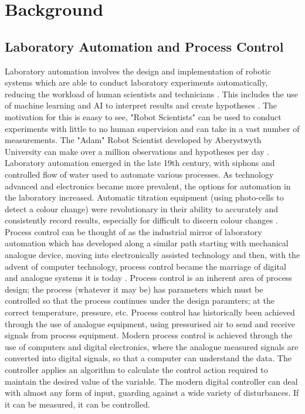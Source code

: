 \documentclass[twoside,a4]{report}
\def\shorttitle{Development of a Rheometer Controller}
\def\br{\newline \newline \noindent}
\def\achapter{\shorttitle}  %
\def\nc#1{
	\addtocounter{chapter}{1} 
	\def\achapter{\arabic{chapter} #1}
	\addcontentsline{toc}{chapter}{\achapter} 
	\chapter*{\arabic{chapter} #1} 
}
\begin{document}


	\nc{Background} %
	\section{Laboratory Automation and Process Control}
	Laboratory automation involves the design and implementation of robotic systems which are able to conduct laboratory experiments automatically, reducing the workload of human scientists and technicians \cite{backwhatisauto}. This includes the use of machine learning and AI to interpret results and create hypotheses \cite{backlitrevai, backbaconauto, backlabauto}. The motivation for this is eaasy to see, "Robot Scientists" can be used to conduct experiments with little to no human supervision and can take in a vast number of measurements. The "Adam" Robot Scientist developed by Aberystwyth University can make over a million observations and hypotheses per day \cite{backontorobsci}. 
	\br
	Laboratory automation emerged in the late 19th century, with siphons and controlled flow of water used to automate various processes. As technology advanced and electronics became more prevalent, the options for automation in the laboratory increased. Automatic titration equipment (using photo-cells to detect a colour change) were revolutionary in their ability to accurately and consistently record results, especially for difficult to discern colour changes \cite{backlabautohisto}. \br
	Process control can be thought of as the industrial mirror of laboratory automation which has developed along a similar path starting with mechanical analogue device, moving into electronically assisted technology and then, with the advent of computer technology, process control became the marriage of digital and analogue systems it is today \cite{backautocontrolhisto}.
	Process control is an inherent area of process design; the process (whatever it may be) has parameters which must be controlled so that the process continues under the design paramters; at the correct temperature, pressure, etc. Process control has historically been achieved through the use of analogue equipment, using pressurised air to send and receive signals from process equipment. Modern process control is achieved through the use of computers and digital electronics, where the analogue measured signals are converted into digital signals, so that a computer can understand the data. The controller applies an algorithm to calculate the control action required to maintain the desired value of the variable. The modern digital controller can deal with almost any form of input, guarding against a wide variety of disturbances. If it can be measured, it can be controlled.\br
\end{document}
